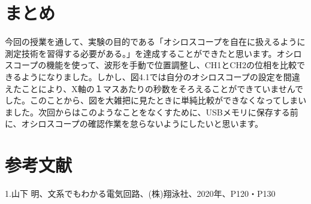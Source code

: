 \documentclass[12pt,a4paper]{jsarticle}
\numberwithin{equation}{section}
\numberwithin{figure}{section}
\numberwithin{table}{section}
\begin{document}
\newpage
\section{まとめ}
今回の授業を通して、実験の目的である「オシロスコープを自在に扱えるように測定技術を習得する必要がある。」を達成することができたと思います。オシロスコープの機能を使って、波形を手動で位置調整し、CH1とCH2の位相を比較できるようになりました。しかし、図4.1では自分のオシロスコープの設定を間違えたことにより、X軸の１マスあたりの秒数をそろえることができていませんでした。このことから、図を大雑把に見たときに単純比較ができなくなってしまいました。次回からはこのようなことをなくすために、USBメモリに保存する前に、オシロスコープの確認作業を怠らないようにしたいと思います。

\section{参考文献}
1.山下 明、文系でもわかる電気回路、(株)翔泳社、2020年、P120・P130
\end{document}
